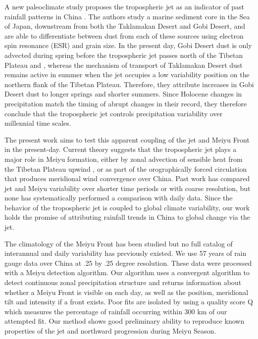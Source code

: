 \documentclass[draft,grl]{AGUTeX}
\begin{document}
\begin{article}
A new paleoclimate study proposes the tropospheric jet as an indicator of past rainfall patterns in China \citep{Nagashima2011}\citep{Nagashima2013}. The authors study a marine sediment core in the Sea of Japan, downstream from both the Taklamakan Desert and Gobi Desert, and are able to differentiate between dust from each of these sources using electron spin resonance (ESR) and grain size. In the present day, Gobi Desert dust is only advected during spring before the tropospheric jet passes north of the Tibetan Plateau and \citep{Roe2009}, whereas the mechanism of transport of Taklamakan Desert dust remains active in summer when the jet occupies a low variability position on the northern flank of the Tibetan Plateau. Therefore, they attribute increases in Gobi Desert dust to longer springs and shorter summers. Since Holocene changes in precipitation match the timing of abrupt changes in their record, they therefore conclude that the tropospheric jet controls precipitation variability over millennial time scales.

The present work aims to test this apparent coupling of the jet and Meiyu Front in the present-day. Current theory suggests that the tropospheric jet plays a major role in Meiyu formation, either by zonal advection of sensible heat from the Tibetan Plateau upwind \citep{Sampe2010}, or as part of the orographically forced circulation that produces meridional wind convergence over China\citep{Chen2014}. Past work has compared jet and Meiyu variability over shorter time periods or with coarse resolution\cite{Liang1998}, but none has systematically performed a comparison with daily data. Since the behavior of the tropospheric jet is coupled to global climate variability, our work holds the promise of attributing rainfall trends in China to global change via the jet.

The climatology of the Meiyu Front has been studied\citep{Ding2005} but no full catalog of interannual and daily variability has previously existed. We use 57 years of rain gauge data over China at .25 by .25 degree resolution\citep{Yatagai2012}. These data were processed with a Meiyu detection algorithm. Our algorithm uses a convergent algorithm to detect continuous zonal precipitation structure and returns information about whether a Meiyu Front is visible on each day, as well as the position, meridional tilt and intensity if a front exists. Poor fits are isolated by using a quality score Q which measures the percentage of rainfall occurring within 300 km of our attempted fit. Our method shows good preliminary ability to reproduce known properties of the jet and northward progression during Meiyu Season. 


\end{article}
\end{document}
